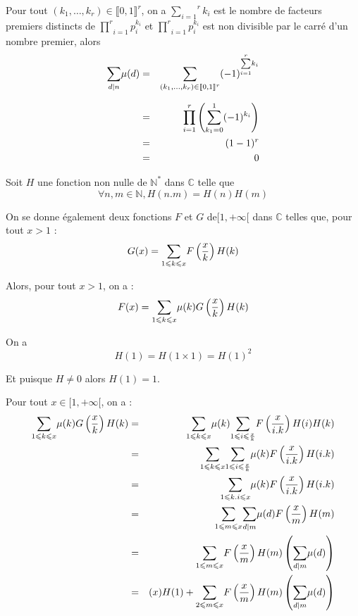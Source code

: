 Pour tout $(k_1, \ldots, k_r) \in \llbracket 0, 1 \rrbracket^r$, on a
$\overset{r}{\underset{i = 1}{\sum}} k_i$ est le nombre de facteurs premiers
distincts de $\underset{i = 1}{\overset{r}{\prod}} p^{k_i}_i$ et $\underset{i
= 1}{\overset{r}{\prod}} p^{k_i}_i$ est non divisible par le carr{\'e} d'un
nombre premier, alors
\begin{eqnarray*}
  \underset{d |  n}{\sum} \mu (d) & = & \underset{}{\underset{(k_1,
  \ldots, k_r) \in \llbracket 0, 1 \rrbracket^r}{\overset{}{\sum}}} (-
  1)^{\overset{r}{\underset{i = 1}{\sum}} k_i}\\
  & = & \underset{i = 1}{\overset{r}{\prod}} \left( \underset{k_1 =
  0}{\overset{1 }{\sum}} (- 1)^{k_i} \right)\\
  & = & (1 - 1)^r\\
  & = & 0
\end{eqnarray*}



Soit $H$ une fonction non nulle de $\mathbb{N}^{\ast}$ dans
$\mathbb{C}$ telle que
\[ \forall n, m \in \mathbb{N}, H (n.m) = H (n) H (m) \]


On se donne {\'e}galement deux fonctions $F$ et $G$ de$[1, + \infty [$ dans
$\mathbb{C}$ telles que, pour tout $x > 1$ :
\[ {\color[HTML]{000000}{\color[HTML]{000000}G (x) = \underset{1 \leqslant k
   \leqslant x}{\sum} F \left( \frac{x}{k} \right) H (k)}} \]


Alors, pour tout $x > 1$, on a :
\[ {\color[HTML]{000000}{\color[HTML]{000000}F (x) = \underset{1 \leqslant k
   \leqslant x}{\sum} \mu (k) G \left( \frac{x}{k} \right) H (k)}} \]



On a
\[ H (1) = H (1 \times 1) = H (1)^2 \]


Et puisque $H \neq 0$ alors $H (1) = 1$.

Pour tout $x \in [1, + \infty [$, on a :
\begin{eqnarray*}
  \underset{1 \leqslant k \leqslant x}{\sum} \mu (k) G \left( \frac{x}{k}
  \right) H (k) & = & \underset{1 \leqslant k \leqslant x}{\sum} \mu (k)
  \underset{1 \leqslant i \leqslant \frac{x}{k}}{\sum} F \left( \frac{x}{i.k}
  \right) H (i) H (k)\\
  & = & \underset{1 \leqslant k \leqslant x}{\sum} \underset{1 \leqslant i
  \leqslant \frac{x}{k}}{\sum} \mu (k) F \left( \frac{x}{i.k} \right) H
  (i.k)\\
  & = & \underset{1 \leqslant k.i \leqslant x}{\sum} \mu (k) F \left(
  \frac{x}{i.k} \right) H (i.k)\\
  & = & \underset{1 \leqslant m \leqslant x}{\sum} \underset{d | 
  m}{\sum} \mu (d) F \left( \frac{x}{m} \right) H (m)\\
  & = & \underset{1 \leqslant m \leqslant x}{\sum} F \left( \frac{x}{m}
  \right) H (m) \left( \underset{d |  m}{\sum} \mu (d) \right)\\
  & = & (x) H (1) + \underset{2 \leqslant m \leqslant x}{\sum} F \left(
  \frac{x}{m} \right) H (m) \left( \underset{d |  m}{\sum} \mu (d)
  \right)
\end{eqnarray*}


